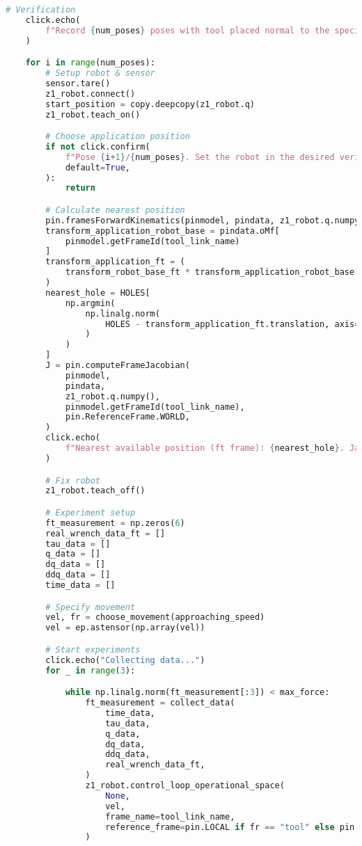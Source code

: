\begin{lstlisting}[language=python, caption=\raggedright{verification/fs\_verification.py}, frame=single]
    # Verification
    click.echo(
        f"Record {num_poses} poses with tool placed normal to the specified surface."
    )

    for i in range(num_poses):
        # Setup robot & sensor
        sensor.tare()
        z1_robot.connect()
        start_position = copy.deepcopy(z1_robot.q)
        z1_robot.teach_on()

        # Choose application position
        if not click.confirm(
            f"Pose {i+1}/{num_poses}. Set the robot in the desired verification position. Continue?",
            default=True,
        ):
            return

        # Calculate nearest position
        pin.framesForwardKinematics(pinmodel, pindata, z1_robot.q.numpy())
        transform_application_robot_base = pindata.oMf[
            pinmodel.getFrameId(tool_link_name)
        ]
        transform_application_ft = (
            transform_robot_base_ft * transform_application_robot_base
        )
        nearest_hole = HOLES[
            np.argmin(
                np.linalg.norm(
                    HOLES - transform_application_ft.translation, axis=1
                )
            )
        ]
        J = pin.computeFrameJacobian(
            pinmodel,
            pindata,
            z1_robot.q.numpy(),
            pinmodel.getFrameId(tool_link_name),
            pin.ReferenceFrame.WORLD,
        )
        click.echo(
            f"Nearest available position (ft frame): {nearest_hole}. Jacobian condition number: {np.linalg.cond(J)}."
        )

        # Fix robot
        z1_robot.teach_off()

        # Experiment setup
        ft_measurement = np.zeros(6)
        real_wrench_data_ft = []
        tau_data = []
        q_data = []
        dq_data = []
        ddq_data = []
        time_data = []

        # Specify movement
        vel, fr = choose_movement(approaching_speed)
        vel = ep.astensor(np.array(vel))

        # Start experiments
        click.echo("Collecting data...")
        for _ in range(3):

            while np.linalg.norm(ft_measurement[:3]) < max_force:
                ft_measurement = collect_data(
                    time_data,
                    tau_data,
                    q_data,
                    dq_data,
                    ddq_data,
                    real_wrench_data_ft,
                )
                z1_robot.control_loop_operational_space(
                    None,
                    vel,
                    frame_name=tool_link_name,
                    reference_frame=pin.LOCAL if fr == "tool" else pin.WORLD,
                )


\end{lstlisting}
